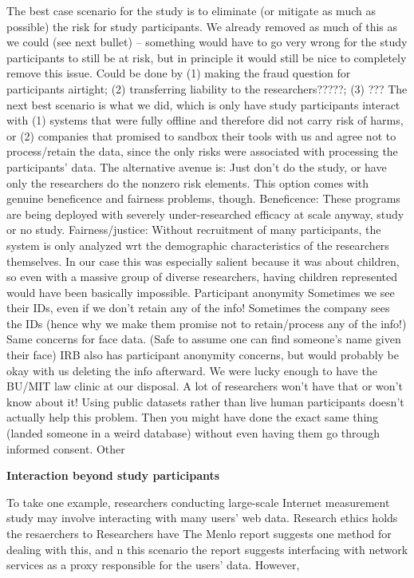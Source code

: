 \begin{outline}
\3 The best case scenario for the study is to eliminate (or mitigate as much as possible) the risk for study participants.  We already removed as much of this as we could (see next bullet) – something would have to go very wrong for the study participants to still be at risk, but in principle it would still be nice to completely remove this issue.  Could be done by (1) making the fraud question for participants airtight; (2) transferring liability to the researchers?????; (3) ???
\3 The next best scenario is what we did, which is only have study participants interact with (1) systems that were fully offline and therefore did not carry risk of harms, or (2) companies that promised to sandbox their tools with us and agree not to process/retain the data, since the only risks were associated with processing the participants’ data.
\3 The alternative avenue is: Just don’t do the study, or have only the researchers do the nonzero risk elements.  This option comes with genuine beneficence and fairness problems, though.  Beneficence: These programs are being deployed with severely under-researched efficacy at scale anyway, study or no study.  Fairness/justice: Without recruitment of many participants, the system is only analyzed wrt the demographic characteristics of the researchers themselves.  In our case this was especially salient because it was about children, so even with a massive group of diverse researchers, having children represented would have been basically impossible.
\2 Participant anonymity
\3 Sometimes we see their IDs, even if we don’t retain any of the info!
\3 Sometimes the company sees the IDs (hence why we make them promise not to retain/process any of the info!)
\3 Same concerns for face data.  (Safe to assume one can find someone’s name given their face)
\3 IRB also has participant anonymity concerns, but would probably be okay with us deleting the info afterward.
\2 We were lucky enough to have the BU/MIT law clinic at our disposal.  A lot of researchers won’t have that or won’t know about it!
\2 Using public datasets rather than live human participants doesn’t actually help this problem.  Then you might have done the exact same thing (landed someone in a weird database) without even having them go through informed consent.
\2 Other 

\end{outline}


\textbf{Interaction beyond study participants}




To take one example, researchers conducting large-scale Internet measurement study may involve interacting with many users' web data.
Research ethics holds the resaerchers to 
Researchers have 
The Menlo report suggests one method for dealing with this, and n this scenario the report suggests interfacing with network services as a proxy responsible for the users' data.
However, 

